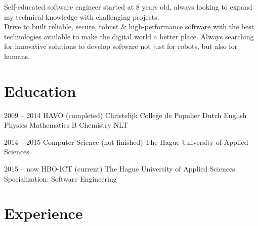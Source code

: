\documentclass[]{friggeri-cv}
\begin{document}
Self-educated software engineer started at 8 years old, always looking to expand
my technical knowledge with challenging projects.\\
Drive to built reliable, secure, robust \& high-performance software with the
best technologies available to make the digital world a better place.
Always searching for innovative solutions to develop software not just for
robots, but also for humans.


\section{Education}

\begin{entrylist}


\entry
{2009 -- 2014}
{HAVO {\normalfont (completed)}}
{Christelijk College de Populier}
{Dutch \textperiodcentered{} English \textperiodcentered{} Physics \textperiodcentered{} Mathematics B \textperiodcentered{} Chemistry \textperiodcentered{} NLT}


\entry
{2014 -- 2015}
{Computer Science {\normalfont (not finished)}}
{The Hague University of Applied Sciences}


\entry
{2015 -- now}
{HBO-ICT {\normalfont (current)}}
{The Hague University of Applied Sciences}
{Specialization: Software Engineering}


\end{entrylist}


\section{Experience}
\end{document}

